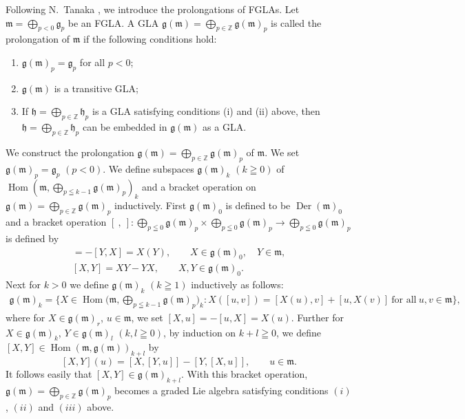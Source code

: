 \documentclass[pdftex]{sigma}
\numberwithin{equation}{section}
\numberwithin{theorem}{section}
\numberwithin{proposition}{section}
\numberwithin{lemma}{section}
\numberwithin{corollary}{section}
\numberwithin{definition}{section}
\numberwithin{example}{section}
\numberwithin{remark}{section}
\numberwithin{note}{section}
\newcommand{\Hom}{\operatorname{Hom}}
\newcommand{\Der}{\operatorname{Der}}
\begin{document}
Following N.~Tanaka \cite{tan70:1}, we introduce the prolongations of FGLAs.
Let $\mathfrak m=\bigoplus\limits_{p<0}\mathfrak g_p$ be an FGLA.
A GLA
$\mathfrak g(\mathfrak m)
=\bigoplus\limits_{p\in\mathbb Z}\mathfrak g(\mathfrak m)_p$ is called the prolongation of $\mathfrak m$ if the following conditions hold:
\begin{enumerate}\itemsep=0pt
\renewcommand{\labelenumi}{$(\roman{enumi})$}
\item $\mathfrak g(\mathfrak m)_p=\mathfrak g_p$ for all $p<0$;
\item $\mathfrak g(\mathfrak m)$ is a transitive GLA;
\item If $\mathfrak h=\bigoplus\limits_{p\in\mathbb Z}\mathfrak h_p$ is a
GLA satisfying conditions (i) and (ii) above, then
$\mathfrak h=\bigoplus\limits_{p\in\mathbb Z}\mathfrak h_p$ can be embedded in
$\mathfrak g(\mathfrak m)$ as a GLA.
\end{enumerate}
We construct the prolongation $\mathfrak g(\mathfrak m)
=\bigoplus\limits_{p\in\mathbb Z}\mathfrak g(\mathfrak m)_p$ of $\mathfrak m$.
We set $\mathfrak g(\mathfrak m)_p=\mathfrak g_p$ $(p<0)$.
We def\/ine subspaces $\mathfrak g(\mathfrak m)_k$ $(k\geqq0)$ of
$\Hom(\mathfrak m,\bigoplus\limits_{p\leqq k-1}\mathfrak g(\mathfrak m)_p)_k$
and a bracket operation on $\mathfrak g(\mathfrak m)
=\bigoplus\limits_{p\in\mathbb Z}\mathfrak g(\mathfrak m)_p$ inductively.
First $\mathfrak g(\mathfrak m)_0$ is def\/ined to be $\Der(\mathfrak m)_0$ and a bracket operation $[\ ,\ ]:\bigoplus\limits_{p\leqq 0}\mathfrak g(\mathfrak m)_p\times \bigoplus\limits_{p\leqq 0}\mathfrak g(\mathfrak m)_p\to
\bigoplus\limits_{p\leqq 0}\mathfrak g(\mathfrak m)_p$ is def\/ined by
\begin{gather*}
[X,Y]=-[Y,X]=X(Y),\qquad  X\in\mathfrak g(\mathfrak m)_0, \quad Y\in\mathfrak m,\\
[X,Y]=XY-YX, \qquad  X,Y\in\mathfrak g(\mathfrak m)_0 .
\end{gather*}
Next for $k>0$ we def\/ine $\mathfrak g(\mathfrak m)_k$ $(k\geqq1)$ inductively
as follows:
\begin{gather*}
\mathfrak g(\mathfrak m)_k
=\Big\{ X\in\Hom\Big(\mathfrak m,\!\bigoplus_{p\leqq k-1}\mathfrak g(\mathfrak m)_p\Big)_k\!:
X([u,v])=[X(u),v]+[u,X(v)]\  \text{for all}\ u,v\in\mathfrak m\Big\},
\end{gather*}
where for $X\in\mathfrak g(\mathfrak m)_r$, $u\in\mathfrak m$,
we set $[X,u]=-[u,X]=X(u)$. Further for $X\in\mathfrak g(\mathfrak m)_k$,
$Y\in\mathfrak g(\mathfrak m)_l$ $(k,l\geqq0)$, by induction on $k+l\geqq0$,
we def\/ine $[X,Y]\in\Hom(\mathfrak m,\mathfrak g(\mathfrak m))_{k+l}$ by
\[
[X,Y](u)=[X,[Y,u]]-[Y,[X,u]],\qquad  u\in \mathfrak m .
\]
It follows easily that $[X,Y]\in \mathfrak g(\mathfrak m)_{k+l}$.
With this bracket operation, $\mathfrak g(\mathfrak m)
=\bigoplus\limits_{p\in\mathbb Z}\mathfrak g(\mathfrak m)_p$ becomes a graded
Lie algebra satisfying conditions $(i)$, $(ii)$ and $(iii)$ above.
\end{document}
